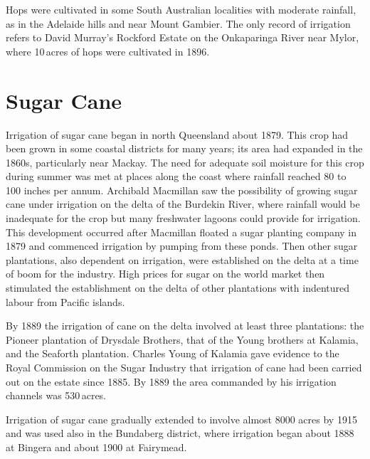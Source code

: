 Hops were cultivated in some South Australian localities with moderate
rainfall, as in the Adelaide hills and near Mount Gambier.  The only record of irrigation refers to David Murray's
Rockford Estate on the Onkaparinga River 
near Mylor,  where 10\,acres of hops were cultivated
in 1896.

\section*{Sugar Cane} 

Irrigation of sugar cane began in north Queensland about 1879.  This
crop had been grown in some coastal districts for many years; its area
had expanded in the 1860s, particularly near Mackay.  The need for adequate soil moisture for this crop during summer
was met at places along the coast where rainfall reached 80 to 100
inches per annum.  Archibald Macmillan  saw the
possibility of growing sugar cane under irrigation on the delta of the
Burdekin River,  where rainfall would be
inadequate for the crop but many freshwater lagoons could provide for
irrigation.  This development occurred after Macmillan floated a sugar
planting company in 1879 and commenced irrigation by pumping from
these ponds.  Then other sugar plantations, also dependent on
irrigation, were established on the delta at a time of boom for the
industry.  High prices for sugar on the world market then stimulated
the establishment on the delta of other plantations with indentured
labour from Pacific islands.

By 1889 the irrigation of cane on the delta involved at least three
plantations: the Pioneer plantation of Drysdale Brothers,
 that of the
Young brothers at Kalamia,  and the Seaforth
plantation.  Charles Young  of Kalamia gave evidence
to the Royal Commission on the Sugar Industry that irrigation of cane
had been carried out on the estate since 1885. By 1889 the area
commanded by his irrigation channels was 530\,acres.

Irrigation of sugar cane gradually extended to involve almost 8000
acres by 1915 and was used also in the Bundaberg
 district, where
irrigation began about 1888 at Bingera  and about
1900 at Fairymead.


